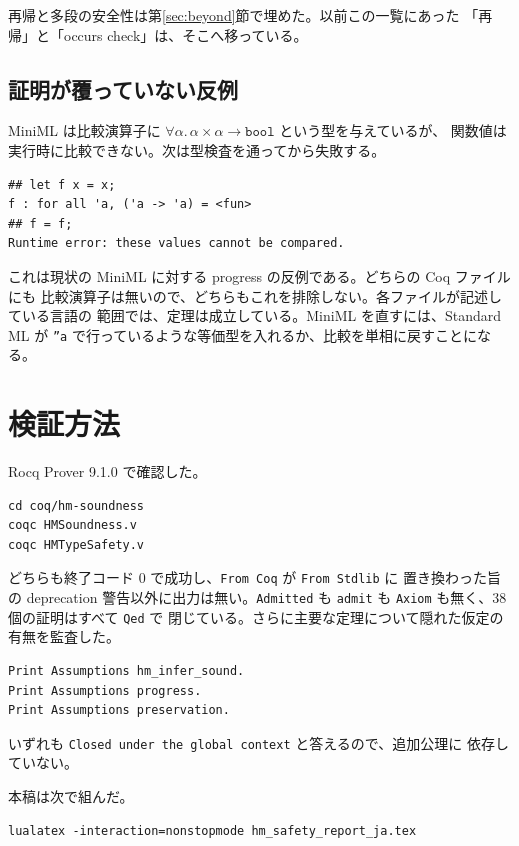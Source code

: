 \documentclass[11pt,a4paper]{ltjsarticle}
\newcommand{\tbool}{\mathtt{bool}}
\begin{document}
再帰と多段の安全性は第\ref{sec:beyond}節で埋めた。以前この一覧にあった
「再帰」と「occurs check」は、そこへ移っている。

\subsection{証明が覆っていない反例}

MiniML は比較演算子に
$\forall\alpha.\,\alpha \times \alpha \to \tbool$ という型を与えているが、
関数値は実行時に比較できない。次は型検査を通ってから失敗する。

\begin{lstlisting}
## let f x = x;
f : for all 'a, ('a -> 'a) = <fun>
## f = f;
Runtime error: these values cannot be compared.
\end{lstlisting}

これは現状の MiniML に対する progress の反例である。どちらの Coq ファイルにも
比較演算子は無いので、どちらもこれを排除しない。各ファイルが記述している言語の
範囲では、定理は成立している。MiniML を直すには、Standard ML が
\texttt{''a} で行っているような等価型を入れるか、比較を単相に戻すことになる。

\section{検証方法}

Rocq Prover 9.1.0 で確認した。

\begin{lstlisting}
cd coq/hm-soundness
coqc HMSoundness.v
coqc HMTypeSafety.v
\end{lstlisting}

どちらも終了コード 0 で成功し、\texttt{From Coq} が \texttt{From Stdlib} に
置き換わった旨の deprecation 警告以外に出力は無い。\texttt{Admitted} も
\texttt{admit} も \texttt{Axiom} も無く、38 個の証明はすべて \texttt{Qed} で
閉じている。さらに主要な定理について隠れた仮定の有無を監査した。

\begin{lstlisting}
Print Assumptions hm_infer_sound.
Print Assumptions progress.
Print Assumptions preservation.
\end{lstlisting}

いずれも \texttt{Closed under the global context} と答えるので、追加公理に
依存していない。

本稿は次で組んだ。

\begin{lstlisting}
lualatex -interaction=nonstopmode hm_safety_report_ja.tex
\end{lstlisting}
\end{document}
